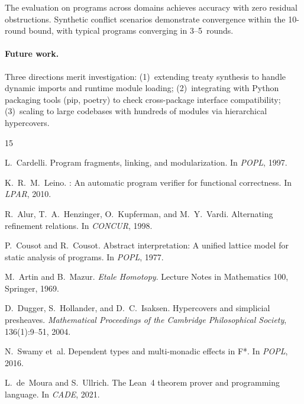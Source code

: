 \documentclass[11pt]{article}
\begin{document}
The evaluation on \expTotalPrograms{} programs across \expDomainCount{}
domains achieves \expAccuracy{} accuracy with zero residual
obstructions.  Synthetic conflict scenarios demonstrate convergence
within the 10-round bound, with typical programs converging in
3--5~rounds.

\paragraph{Future work.}
Three directions merit investigation: (1)~extending treaty synthesis
to handle dynamic imports and runtime module loading; (2)~integrating
with Python packaging tools (pip, poetry) to check cross-package
interface compatibility; (3)~scaling to large codebases with hundreds
of modules via hierarchical hypercovers.


\begin{thebibliography}{15}

L.~Cardelli.
\newblock Program fragments, linking, and modularization.
\newblock In \emph{POPL}, 1997.

K.~R.~M.~Leino.
: An automatic program verifier for functional
correctness.
\newblock In \emph{LPAR}, 2010.

R.~Alur, T.~A.~Henzinger, O.~Kupferman, and M.~Y.~Vardi.
\newblock Alternating refinement relations.
\newblock In \emph{CONCUR}, 1998.

P.~Cousot and R.~Cousot.
\newblock Abstract interpretation: A unified lattice model for static
analysis of programs.
\newblock In \emph{POPL}, 1977.

M.~Artin and B.~Mazur.
\newblock \emph{Etale Homotopy}.
\newblock Lecture Notes in Mathematics 100, Springer, 1969.

D.~Dugger, S.~Hollander, and D.~C.~Isaksen.
\newblock Hypercovers and simplicial presheaves.
\newblock \emph{Mathematical Proceedings of the Cambridge
Philosophical Society}, 136(1):9--51, 2004.

N.~Swamy et~al.
\newblock Dependent types and multi-monadic effects in {F*}.
\newblock In \emph{POPL}, 2016.

L.~de~Moura and S.~Ullrich.
\newblock The {Lean}~4 theorem prover and programming language.
\newblock In \emph{CADE}, 2021.

\end{thebibliography}
\end{document}
